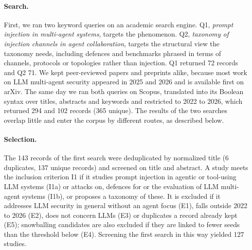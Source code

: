 \documentclass[pdflatex,sn-mathphys-num]{sn-jnl}
\theoremstyle{thmstyleone}%
\theoremstyle{thmstyletwo}%
\theoremstyle{thmstylethree}%
\newcommand{\NQone}{72}
\newcommand{\NQtwo}{71}
\newcommand{\NRecords}{143}
\newcommand{\NDup}{6}
\newcommand{\NUnique}{137}
\newcommand{\NSearch}{127}
\newcommand{\NScQone}{294}
\newcommand{\NScQtwo}{102}
\newcommand{\NScUnique}{365}
\begin{document}
\paragraph{Search.} First, we ran two keyword queries on an academic search engine. Q1, \emph{prompt injection in multi-agent systems}, targets the phenomenon. Q2, \emph{taxonomy of injection channels in agent collaboration}, targets the structural view the taxonomy needs, including defences and benchmarks phrased in terms of channels, protocols or topologies rather than injection. Q1 returned \NQone{} records and Q2 \NQtwo{}. We kept peer-reviewed papers and preprints alike, because most work on LLM multi-agent security appeared in 2025 and 2026 and is available first on arXiv. The same day we ran both queries on Scopus, translated into its Boolean syntax over titles, abstracts and keywords and restricted to 2022 to 2026, which returned \NScQone{} and \NScQtwo{} records (\NScUnique{} unique). The results of the two searches overlap little and enter the corpus by different routes, as described below.

\paragraph{Selection.} The \NRecords{} records of the first search were deduplicated by normalized title (\NDup{} duplicates, \NUnique{} unique records) and screened on title and abstract. A study meets the inclusion criterion I1 if it studies prompt injection in agentic or tool-using LLM systems (I1a) or attacks on, defences for or the evaluation of LLM multi-agent systems (I1b), or proposes a taxonomy of these. It is excluded if it addresses LLM security in general without an agent focus (E1), falls outside 2022 to 2026 (E2), does not concern LLMs (E3) or duplicates a record already kept (E5); snowballing candidates are also excluded if they are linked to fewer seeds than the threshold below (E4). Screening the first search in this way yielded \NSearch{} studies.
\end{document}
